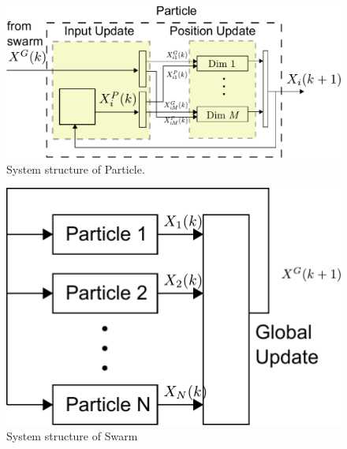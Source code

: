 \begin{figure}
\centering
\includegraphics[width=0.85\linewidth]{./fig/sys_flow.pdf}
\caption{System structure of Particle.}
\label{fig:sys_flow}
\end{figure}

\begin{figure}
\centering
\includegraphics[width=0.6\linewidth]{./fig/pso_sys_flow.pdf}
\caption{System structure of Swarm}
\label{fig:pso_sys_flow}
\end{figure}


